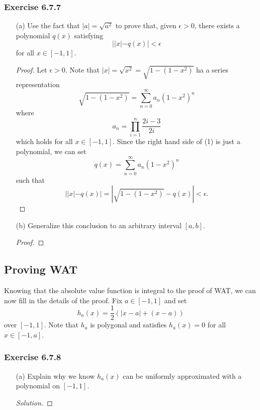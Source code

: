 \subsubsection{Exercise 6.7.7} 
\begin{enumerate}
    \item[(a)] Use the fact that \( | a  |  = \sqrt{ a^{2} }  \) to prove that, given \( \epsilon > 0  \), there exists a polynomial \( q(x)  \) satisfying 
        \[  | | x  | - q(x)  | < \epsilon \]
        for all \( x \in [-1,1] \).
        \begin{proof}
            Let \( \epsilon > 0   \). Note that \( | x  |  = \sqrt{ x^{2}  }  = \sqrt{ 1 - (1 - x^2)  }  \) ha a series representation 
            \[  \sqrt{ 1 - (1-x^2) } = \sum_{ n=0  }^{ \infty  } a_n (1 -x^2)^n \tag{1} \] where 
            \[  a_n =  \prod_{i=1}^{n} \frac{ 2i - 3  }{ 2i } \]which holds for all \( x \in [-1,1] \). Since the right hand side of (1) is just a polynomial, we can set 
            \[  q(x) = \sum_{ n=0 }^{ \infty  } a_n (1-x^{2})^{n} \] such that 
            \[  | | x  | - q(x)   | = | \sqrt{ 1 - (1-x^2) } - q(x) | < \epsilon.  \]
        \end{proof}

    \item[(b)] Generalize this conclusion to an arbitrary interval \( [a,b] \).
        \begin{proof}
        
        \end{proof}
\end{enumerate}



\subsection{Proving WAT} 

Knowing that the absolute value function is integral to the proof of WAT, we can now fill in the details of the proof. Fix \( a \in [-1,1]  \) and set 
\[  h_{a}(x) = \frac{ 1 }{ 2 }  ( | x -a  | + (x-a)) \] over \( [-1,1]  \). Note that \( h_{a}  \) is polygonal and satisfies \( h_{a}(x) = 0  \) for all \( x \in [-1,a] \).

\subsubsection{Exercise 6.7.8} 
\begin{enumerate}
    \item[(a)] Explain why we know \( h_{a}(x)  \) can be uniformly approximated with a polynomial on \( [-1,1] \).
        \begin{proof}[Solution]
        
        \end{proof}
\end{enumerate}










